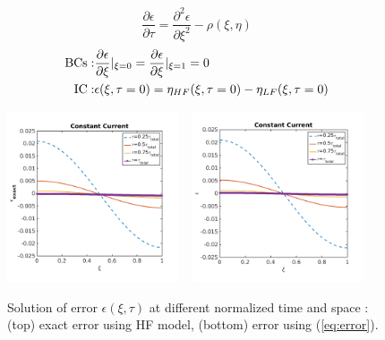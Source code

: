 \documentclass[]{article}
\begin{document}
\begin{equation*}
\frac{\partial\epsilon}{\partial\tau} = \frac{\partial^2\epsilon}{\partial\xi^2} -\rho(\xi,\eta)
\end{equation*}
%
\begin{eqnarray}
{\rm BCs:} & \frac{\partial\epsilon}{\partial\xi}|_{\xi=0} = \frac{\partial\epsilon}{\partial\xi}|_{\xi=1} = 0\\
{\rm IC:} & \epsilon(\xi,\tau=0) = \eta_{HF}(\xi,\tau=0) - \eta_{LF}(\xi,\tau=0)
\end{eqnarray}
%


\begin{figure}[h]
    \centering
    \includegraphics[trim = 0in 0in 0in 0in, clip, width=0.45\textwidth]{figures/error2d_exact.png}
    ~
    \includegraphics[trim = 0in 0in 0in 0in, clip, width=0.45\textwidth]{figures/error2d.png}      
    \caption{Solution of error $\epsilon(\xi,\tau)$ at different normalized time and space : (top) exact error using HF model, (bottom) error using (\ref{eq:error}).}
    \label{fig:error_2d}
\end{figure}
\end{document}

